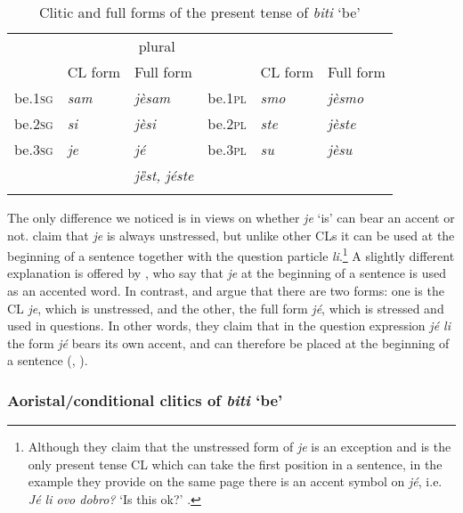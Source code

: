 \begin{table}
\caption{Clitic and full forms of the present tense of \textit{biti} `be'\label{table:clbiti}}
\begin{tabular}{llllll}
\lsptoprule
\multicolumn{3}{c}{singular} & \multicolumn{3}{c}{plural}\\\cmidrule(lr){1-3}\cmidrule(lr){4-6}
& CL form & Full form & & CL form & Full form\\\midrule
be.\textsc{1sg} & \textit{sam} & \textit{jèsam} & be.\textsc{1pl} & \textit{smo} & \textit{jèsmo} \\
be.\textsc{2sg} & \textit{si} & \textit{jèsi}   & be.\textsc{2pl} & \textit{ste} & \textit{jèste} \\
be.\textsc{3sg} & \textit{je} & \textit{jé}     & be.\textsc{3pl} & \textit{su} & \textit{jèsu} \\
&& \textit{jȅst, jéste} &&& \\
\lspbottomrule
\end{tabular}
\end{table}


The only difference we noticed is in views on whether \textit{je} `is' can bear an accent or not. \citet[128]{MrazovicVukadinovic09} claim that \textit{je} is always unstressed, but unlike other CLs it can be used at the beginning of a sentence together with the question particle \textit{li}.\footnote{Although they claim that the unstressed form of \textit{je} is an exception and is the only present tense CL which can take the first position in a sentence, in the example they provide on the same page there is an accent symbol on \textit{jé}, i.e. \textit{Jé li ovo dobro?} `Is this ok?' \citep[cf.][128]{MrazovicVukadinovic09}.}  A slightly different explanation is offered by \citet[272]{JHP00}, who say that \textit{je} at the beginning of a sentence is used as an accented word. In contrast, \citet[496]{Katicic86} and \citet[198]{PiperKlajn14} argue that there are two forms: one is the CL \textit{je}, which is unstressed, and the other, the full form \textit{jé}, which is stressed and used in questions. In other words, they claim that in the question expression \textit{jé li} the form \textit{jé} bears its own accent, and can therefore be placed at the beginning of a sentence (\citealt[cf.][496]{Katicic86}, \citealt[198]{PiperKlajn14}). 

\subsubsection{Aoristal/conditional clitics of \textit{biti} `be'}

